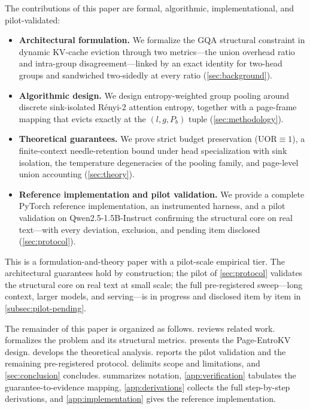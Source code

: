 \documentclass[final,5p,times,twocolumn]{elsarticle}
\theoremstyle{definition}
\theoremstyle{remark}
\newcommand{\method}{Page-EntroKV}
\newcommand{\UOR}{\mathrm{UOR}}
\begin{document}
The contributions of this paper are formal, algorithmic,
implementational, and pilot-validated:
\begin{itemize}
  \item \textbf{Architectural formulation.} We formalize the GQA
        structural constraint in dynamic KV-cache eviction through two
        metrics---the union overhead ratio and intra-group
        disagreement---linked by an exact identity for two-head groups
        and sandwiched two-sidedly at every ratio
        (\cref{sec:background}).
  \item \textbf{Algorithmic design.} We design entropy-weighted group
        pooling around discrete sink-isolated R\'enyi-2 attention
        entropy, together with a page-frame mapping that evicts exactly
        at the $(l, g, P_b)$ tuple (\cref{sec:methodology}).
  \item \textbf{Theoretical guarantees.} We prove strict budget
        preservation ($\UOR \equiv 1$), a finite-context
        needle-retention bound under head specialization with sink
        isolation, the temperature degeneracies of the pooling family,
        and page-level union accounting (\cref{sec:theory}).
  \item \textbf{Reference implementation and pilot validation.} We
        provide a complete PyTorch reference implementation, an
        instrumented harness, and a pilot validation on
        Qwen2.5-1.5B-Instruct confirming the structural core on real
        text---with every deviation, exclusion, and pending item
        disclosed (\cref{sec:protocol}).
\end{itemize}

This is a formulation-and-theory paper with a pilot-scale empirical
tier. The architectural guarantees hold by construction; the pilot of
\cref{sec:protocol} validates the structural core on real text at small
scale; the full pre-registered sweep---long context, larger models, and
serving---is in progress and disclosed item by item in
\cref{subsec:pilot-pending}.

The remainder of this paper is organized as follows.
 reviews related work.  formalizes
the problem and its structural metrics.  presents
the \method{} design.  develops the theoretical
analysis.  reports the pilot validation and the
remaining pre-registered protocol.  delimits scope
and limitations, and \cref{sec:conclusion} concludes.
 summarizes notation, \cref{app:verification}
tabulates the guarantee-to-evidence mapping,
\cref{app:derivations} collects the full step-by-step derivations, and
\cref{app:implementation} gives the reference implementation.
\end{document}
